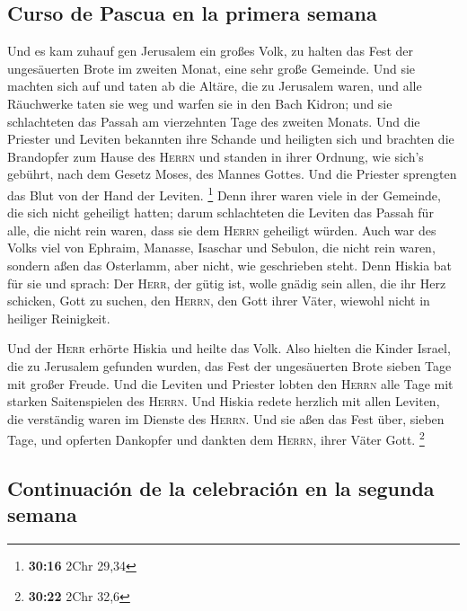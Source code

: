 \hypertarget{curso-de-pascua-en-la-primera-semana}{%
\subsection{Curso de Pascua en la primera
semana}\label{curso-de-pascua-en-la-primera-semana}}

 Und es kam zuhauf gen Jerusalem ein großes Volk, zu
halten das Fest der ungesäuerten Brote im zweiten Monat, eine sehr große
Gemeinde.  Und sie machten sich auf und taten ab die
Altäre, die zu Jerusalem waren, und alle Räuchwerke taten sie weg und
warfen sie in den Bach Kidron;  und sie schlachteten das
Passah am vierzehnten Tage des zweiten Monats. Und die Priester und
Leviten bekannten ihre Schande und heiligten sich und brachten die
Brandopfer zum Hause des \textsc{Herrn}  und standen in
ihrer Ordnung, wie sich's gebührt, nach dem Gesetz Moses, des Mannes
Gottes. Und die Priester sprengten das Blut von der Hand der Leviten.
\footnote{\textbf{30:16} 2Chr 29,34}  Denn ihrer waren
viele in der Gemeinde, die sich nicht geheiligt hatten; darum
schlachteten die Leviten das Passah für alle, die nicht rein waren, dass
sie dem \textsc{Herrn} geheiligt würden.  Auch war des
Volks viel von Ephraim, Manasse, Isaschar und Sebulon, die nicht rein
waren, sondern aßen das Osterlamm, aber nicht, wie geschrieben steht.
Denn Hiskia bat für sie und sprach: Der \textsc{Herr}, der gütig ist,
wolle gnädig sein  allen, die ihr Herz schicken, Gott zu
suchen, den \textsc{Herrn}, den Gott ihrer Väter, wiewohl nicht in
heiliger Reinigkeit.

 Und der \textsc{Herr} erhörte Hiskia und heilte das
Volk.  Also hielten die Kinder Israel, die zu Jerusalem
gefunden wurden, das Fest der ungesäuerten Brote sieben Tage mit großer
Freude. Und die Leviten und Priester lobten den \textsc{Herrn} alle Tage
mit starken Saitenspielen des \textsc{Herrn}.  Und Hiskia
redete herzlich mit allen Leviten, die verständig waren im Dienste des
\textsc{Herrn}. Und sie aßen das Fest über, sieben Tage, und opferten
Dankopfer und dankten dem \textsc{Herrn}, ihrer Väter Gott. \footnote{\textbf{30:22}
  2Chr 32,6}

\hypertarget{continuaciuxf3n-de-la-celebraciuxf3n-en-la-segunda-semana}{%
\subsection{Continuación de la celebración en la segunda
semana}\label{continuaciuxf3n-de-la-celebraciuxf3n-en-la-segunda-semana}}

